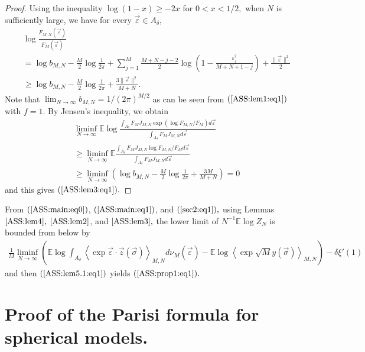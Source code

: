\documentclass[12pt]{article}
\def\bbox{\quad\hbox{\vrule \vbox{\hrule \vskip2pt \hbox{\hskip2pt
\vbox{\hsize=1pt}\hskip2pt} \vskip2pt\hrule}\vrule}}
\def\qed{\hfill\break\rightline{$\bbox$}}
\newcommand{\veps}{\vec{\varepsilon}}
\newcommand{\vsi}{{\vec{\sigma}}}
\newcommand{\vz}{\vec{z}}
\newenvironment{Proof of lemma}{\noindent{\bf Proof of Lemma}}{\hfill$\Box$\newline}
\newenvironment{Proof of theorem}{\noindent{\bf Proof of Theorem}}{\hfill{\footnotesize${\square}$}\newline}
\newenvironment{Proof of theorems}{\noindent{\bf Proof of Theorems}}{\hfill$\Box$\newline}
\newenvironment{Proof of proposition}{\noindent{\bf Proof of Proposition}}{\hfill$\Box$\newline}
\newenvironment{Proof of propositions}{\noindent{\bf Proof of Propositions}}{\hfill$\Box$\newline}
\newenvironment{Proof of exercise}{\noindent{\it Proof of Exercise:}}{\hfill$\Box$}
\numberwithin{equation}{section}
\begin{document}
\begin{proof}
Using the inequality $\log(1-x)\geq -2x$ for $0<x<1/2,$ when $N$ is sufficiently large, we have for every $\veps\in A_\delta,$
\begin{align*}
&\log \frac{F_{M,N}(\veps)}{F_M(\veps)}\\
&=\log b_{M,N}-\frac{M}{2}\log\frac{1}{2\pi}+\sum_{j=1}^M\frac{M+N-j-2}{2}\log\left(1-\frac{\varepsilon_j^2}{M+N+1-j}\right)+\frac{\|\veps\|^2}{2}\\
&\geq \log b_{M,N}-\frac{M}{2}\log\frac{1}{2\pi}+\frac{3\|\veps\|^2}{M+N}.
\end{align*}
Note that $\lim_{N\rightarrow\infty}b_{M,N}=1/(2\pi)^{M/2}$ as can be seen from $(\ref{ASS:lem1:eq1})$ with $f=1.$ By Jensen's inequality, we obtain
\begin{align*}
&\liminf_{N\rightarrow\infty}\mathbb{E}\log\frac{\int_{A_\delta}F_MJ_{M,N}\exp \left(\log F_{M,N}/F_{M}\right)d\veps}{\int_{A_\delta}F_MJ_{M,N}d\veps}\\
&\geq \liminf_{N\rightarrow\infty}\mathbb{E}\frac{\int_{A_\delta}F_MJ_{M,N}\log F_{M,N}/F_{M}d\veps}{\int_{A_\delta}F_MJ_{M,N}d\veps}\\
&\geq \liminf_{N\rightarrow\infty}\left(\log b_{M,N}-\frac{M}{2}\log \frac{1}{2\pi}+\frac{3M}{M+N}\right)=0
\end{align*}
and this gives $(\ref{ASS:lem3:eq1}).$
\end{proof}

\smallskip

From $(\ref{ASS:main:eq0})$, $(\ref{ASS:main:eq1})$, and $(\ref{sec2:eq1}),$ using Lemmas  $\ref{ASS:lem4},$ $\ref{ASS:lem2}$, and $\ref{ASS:lem3},$ the lower limit of 
$N^{-1}{\mathbb{E}\log Z_{N}}$ is bounded from below by
\begin{align*}
\frac{1}{M}\liminf_{N\rightarrow\infty}\left(\mathbb{E}\log\int_{A_\delta}\left<\exp \veps\cdot\vz(\vsi)\right>_{M,N}d\nu_M(\veps)-\mathbb{E}\log \left<\exp\sqrt{M}y(\vsi)\right>_{M,N}\right)-\delta\xi'(1)
\end{align*}
and then  $(\ref{ASS:lem5.1:eq1})$ yields $(\ref{ASS:prop1:eq1}).$\qed



\section{Proof of the Parisi formula for spherical models.}\label{proof}
\end{document}
